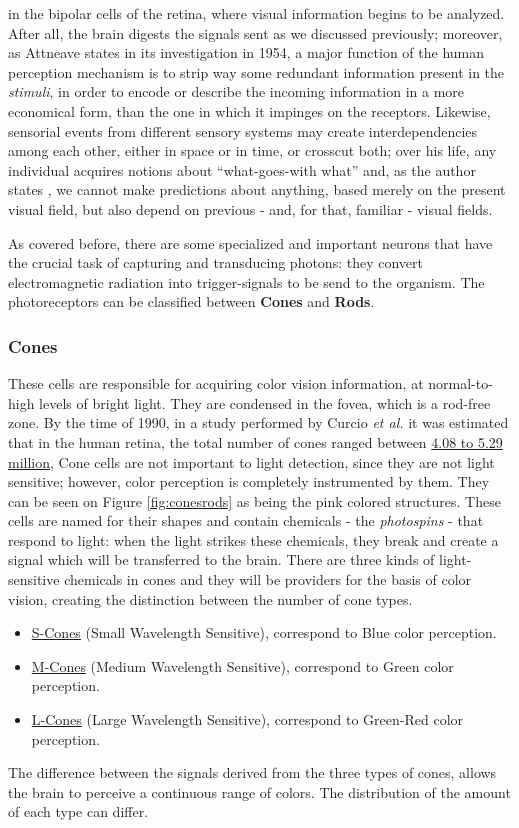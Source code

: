 \documentclass{report}
\begin{document}
in the bipolar cells of the retina, where visual information begins to be analyzed. After all, the brain digests the signals sent as we discussed
previously; moreover, as Attneave \cite{Attneave1954} states in its investigation in 1954, a major function of
the human perception mechanism is to strip way some redundant information present in the \emph{stimuli},
in order to encode or describe the incoming information in a more economical form, than the one in which 
it impinges on the receptors. Likewise, sensorial events from different sensory systems may create
interdependencies among each other, either in space or in time, or crosscut both; over his life, any
individual acquires notions about “what-goes-with what” and, as the author states \cite{Attneave1954}, we cannot make
predictions about anything, based merely on the present visual field, but also depend on previous - and,
for that, familiar - visual fields. \par
As covered before, there are some specialized and important neurons
that have the crucial task of capturing and transducing photons: they convert electromagnetic radiation 
into trigger-signals to be send to the organism.
The photoreceptors can be classified between \textbf{Cones} and \textbf{Rods}. \par
%
\subsubsection{Cones}
These cells are responsible for acquiring color vision information, at normal-to-high levels of bright
light. They are condensed in the fovea, which is a rod-free zone. By the time of 1990, in a study performed
by Curcio \emph{et al.} \cite{Curcio1990} it was estimated that in the human retina, the total number of cones ranged
between \underline{4.08 to 5.29 million}, Cone cells are not important to light detection, since they are not light
sensitive; however, color perception is completely instrumented by them. They can be seen on Figure \ref{fig:conesrods} as
being the pink colored structures.
These cells are named for their shapes and contain chemicals - the \emph{photospins} - that respond to light: when the
light strikes these chemicals, they break and create a signal which will be transferred to the brain. 
There are three kinds of light-sensitive chemicals in cones and they will be providers for the basis
of color vision, creating the distinction between the number of cone types.
%
\begin{itemize}
\item \underline{S-Cones} (Small Wavelength Sensitive), correspond to Blue color perception. 
\item \underline{M-Cones} (Medium Wavelength Sensitive), correspond to Green color perception. 
\item \underline{L-Cones} (Large Wavelength Sensitive), correspond to Green-Red color perception.
\end{itemize} \par
%
The difference between the signals derived from the three types of cones, allows the brain to perceive a
continuous range of colors. The distribution of the amount of each type can differ.
\end{document}
